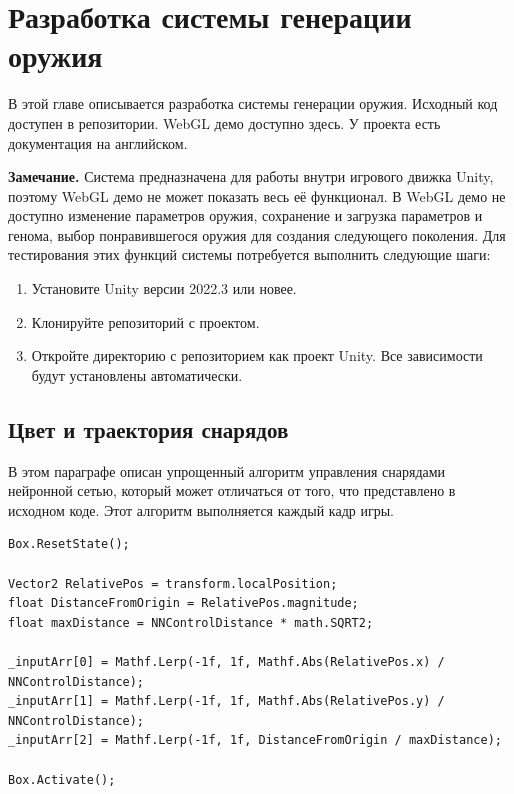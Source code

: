 ﻿%
\section{Разработка системы генерации оружия}

В этой главе описывается разработка системы генерации оружия. Исходный код доступен в репозитории\cite{s7}. WebGL демо доступно здесь\cite{s9}. У проекта есть документация на английском\cite{s13}.

\textbf{Замечание.} Система предназначена для работы внутри игрового движка Unity, поэтому WebGL демо не может показать весь её функционал. В WebGL демо не доступно изменение параметров оружия, сохранение и загрузка параметров и генома, выбор понравившегося оружия для создания следующего поколения. Для тестирования этих функций системы потребуется выполнить следующие шаги:

\begin{enumerate}
    \item Установите Unity версии 2022.3 или новее.
    \item Клонируйте репозиторий с проектом\cite{s7}.
    \item Откройте директорию с репозиторием как проект Unity. Все зависимости будут установлены автоматически.
\end{enumerate}

\subsection{Цвет и траектория снарядов}

В этом параграфе описан упрощенный алгоритм управления снарядами нейронной сетью, который может отличаться от того, что представлено в исходном коде. Этот алгоритм выполняется каждый кадр игры.


\pagebreak

\begin{lstlisting}[name=Projectile, caption={Projectile. Part 1}]
Box.ResetState(); 

Vector2 RelativePos = transform.localPosition;
float DistanceFromOrigin = RelativePos.magnitude;
float maxDistance = NNControlDistance * math.SQRT2;

_inputArr[0] = Mathf.Lerp(-1f, 1f, Mathf.Abs(RelativePos.x) / NNControlDistance);
_inputArr[1] = Mathf.Lerp(-1f, 1f, Mathf.Abs(RelativePos.y) / NNControlDistance);
_inputArr[2] = Mathf.Lerp(-1f, 1f, DistanceFromOrigin / maxDistance);
            
Box.Activate();
\end{lstlisting}

